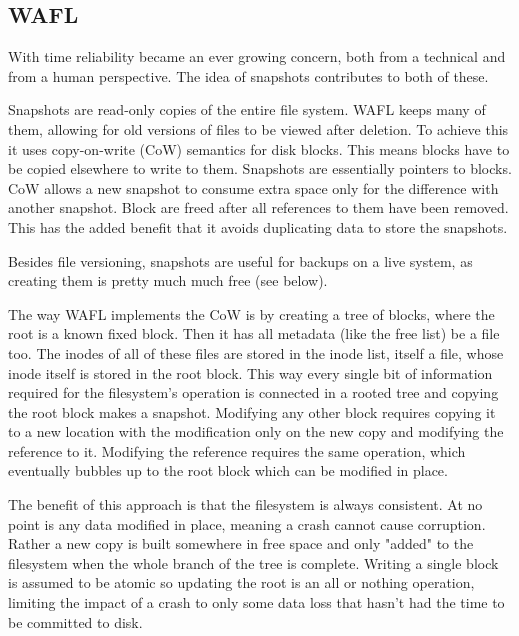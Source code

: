         \subsection{WAFL}
            \label{sec:WAFL}

            With time reliability became an ever growing concern, both from a
            technical and from a human perspective. The idea of snapshots
            contributes to both of these.

            Snapshots are read-only copies of the entire file system. WAFL
            \cite{WAFL} keeps many of them, allowing for old versions of files
            to be viewed after deletion. To achieve this it uses copy-on-write
            (CoW) semantics for disk blocks. This means blocks have to be
            copied elsewhere to write to them. Snapshots are essentially
            pointers to blocks. CoW allows a new snapshot to consume extra
            space only for the difference with another snapshot. Block are
            freed after all references to them have been removed. This has
            the added benefit that it avoids duplicating data to store the
            snapshots.

            Besides file versioning, snapshots are useful for backups on a live
            system, as creating them is pretty much much free (see below).

            The way WAFL implements the CoW is by creating a tree of blocks,
            where the root is a known fixed block. Then it has all metadata
            (like the free list) be a file too. The inodes of all of these
            files are stored in the inode list, itself a file, whose inode
            itself is stored in the root block. This way every single bit of
            information required for the filesystem's operation is connected in
            a rooted tree and copying the root block makes a snapshot.
            Modifying any other block requires copying it to a new location
            with the modification only on the new copy and modifying the
            reference to it. Modifying the reference requires the same
            operation, which eventually bubbles up to the root block which can
            be modified in place.

            The benefit of this approach is that the filesystem is always
            consistent. At no point is any data modified in place, meaning a
            crash cannot cause corruption. Rather a new copy is built somewhere
            in free space and only "added" to the filesystem when the whole
            branch of the tree is complete. Writing a single block is assumed
            to be atomic \cite{drive_atomicity} so updating the root is an all
            or nothing operation, limiting the impact of a crash to only some
            data loss that hasn't had the time to be committed to disk.

